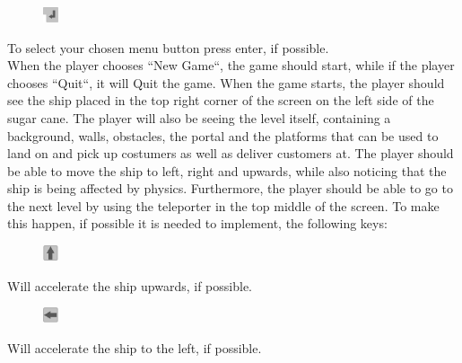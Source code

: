 \documentclass[../master.tex]{subfiles}
\begin{document}
\begin{figure}
	\vspace{-5.8mm}
	\begin{centering}
		\includegraphics[width=0.04\textwidth]{./Pictures/Enter.png}
	\end{centering}
	\vspace{-6mm}
\end{figure}
To select your chosen menu button press enter, if possible.\\

When the player chooses ``New Game``, the game should start, while if the player chooses ``Quit``, it will Quit the game. When the game starts, the player should see the ship placed in the top right corner of the screen on the left side of the sugar cane. The player will also be seeing the level itself, containing a background, walls, obstacles, the portal and the platforms that can be used to land on and pick up costumers as well as deliver customers at. The player should be able to move the ship to left, right and upwards, while also noticing that the ship is being affected by physics. Furthermore, the player should be able to go to the next level by using the teleporter in the top middle of the screen. To make this happen, if possible it is needed to implement, the following keys:\\
\begin{figure}
	\vspace{-6mm}
	\begin{centering}
		\includegraphics[width=0.04\textwidth]{./Pictures/Pil_op.png}
	\end{centering}
	\vspace{-6mm}
\end{figure}
Will accelerate the ship upwards, if possible.\\

\begin{figure}
	\vspace{-6mm}
	\begin{centering}
		\includegraphics[width=0.04\textwidth]{./Pictures/Pil_venstre.png}
	\end{centering}
	\vspace{-6mm}
\end{figure}
Will accelerate the ship to the left, if possible.\\
\end{document}
